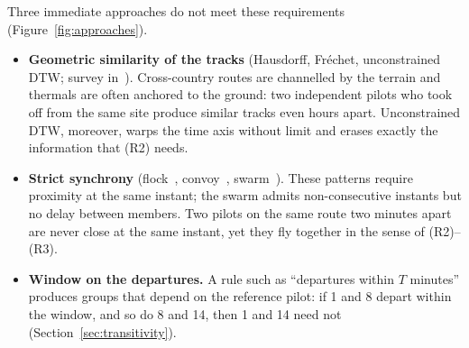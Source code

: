 Three immediate approaches do not meet these requirements (Figure~\ref{fig:approaches}).
\begin{itemize}
  \item \textbf{Geometric similarity of the tracks} (Hausdorff, Fréchet, unconstrained DTW;
    survey in~\cite{su2020}). Cross-country routes are channelled by the terrain and thermals
    are often anchored to the ground: two independent pilots who took off from the same site
    produce similar tracks even hours apart. Unconstrained DTW, moreover, warps the time axis
    without limit and erases exactly the information that (R2) needs.
  \item \textbf{Strict synchrony} (flock~\cite{gudmundsson2006}, convoy~\cite{jeung2008},
    swarm~\cite{li2010}). These patterns require proximity at the same instant; the swarm
    admits non-consecutive instants but no delay between members. Two pilots on the same route
    two minutes apart are never close at the same instant, yet they fly together in the sense
    of (R2)--(R3).
  \item \textbf{Window on the departures.} A rule such as ``departures within $T$ minutes''
    produces groups that depend on the reference pilot: if 1 and 8 depart within the window,
    and so do 8 and 14, then 1 and 14 need not (Section~\ref{sec:transitivity}).
\end{itemize}

